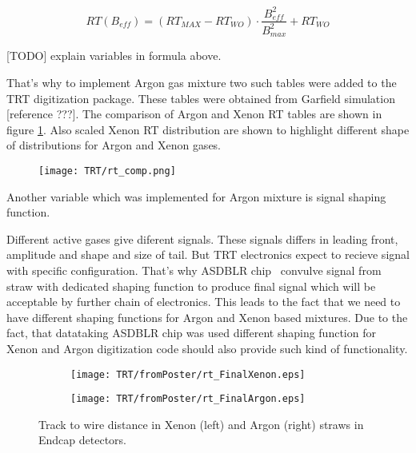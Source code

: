 \begin{displaymath}
    RT(B_{eff}) = (RT_{MAX} - RT_{WO}) \cdot \dfrac{B_{eff}^2}{B_{max}^2} + RT_{WO}
\end{displaymath}

[TODO] explain variables in formula above.

That's why to implement Argon gas mixture two such tables were added to the TRT digitization package.
These tables were obtained from Garfield simulation [reference ???].
The comparison of Argon and Xenon RT tables are shown in figure \ref{fig:rt_comp}. 
Also scaled Xenon RT distribution are shown to highlight different shape of distributions for Argon and Xenon gases.


\begin{figure}
\begin{center}
 \texttt{[image: TRT/rt\_comp.png]}
\caption{\label{fig:rt_comp} }
\end{center}
\end{figure}

Another variable which was implemented for Argon mixture is signal shaping function. 

Different active gases give diferent signals. These signals differs in leading front, amplitude and shape and size of tail. But TRT electronics expect to recieve signal with specific configuration.
That's why ASDBLR chip~\cite{TRT_electronics} convulve signal from straw with dedicated shaping function to produce final signal which will be acceptable by further chain of electronics. This leads to the fact that we need
to have different shaping functions for Argon and Xenon based mixtures.
Due to the fact, that datataking ASDBLR chip was used different shaping function for Xenon and Argon 
digitization code should also provide such kind of functionality. 

\begin{figure}

\begin{subfigure}{.5\textwidth}
  \centering
  \texttt{[image: TRT/fromPoster/rt\_FinalXenon.eps]}
\end{subfigure}%
\begin{subfigure}{.5\textwidth}
  \centering
  \texttt{[image: TRT/fromPoster/rt\_FinalArgon.eps]}
\end{subfigure}

\caption{Track to wire distance in Xenon (left) and Argon (right) straws in Endcap detectors.}
  \label{fig:RT_xenon_argon}
\end{figure}

